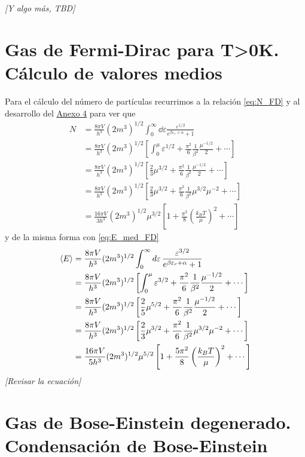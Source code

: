 \textit{[Y algo más, TBD]}

\section{Gas de Fermi-Dirac para T>0K. Cálculo de valores medios}

Para el cálculo del número de partículas recurrimos a la relación \eqref{eq:N_FD} y al desarrollo del \hyperref[Anx4]{Anexo 4} para ver que
\begin{align}
	N &= \frac{8\pi V}{h^3} (2m^3)^{1/2} \int_{0}^{\infty} \dd{\varepsilon} \frac{\varepsilon^{1/2}}{e^{\beta\varepsilon_r + \alpha} + 1}  \nonumber \\
	&= \frac{8\pi V}{h^3} (2m^3)^{1/2} \left[ \int_0^{\mu} \varepsilon^{1/2} + \frac{\pi^2}{6}\frac{1}{\beta^2}\frac{\mu^{-1/2}}{2} + \cdots \right] \nonumber \\
	&= \frac{8\pi V}{h^3} (2m^3)^{1/2} \left[ \frac{2}{3}\mu^{3/2} + \frac{\pi^2}{6}\frac{1}{\beta^2}\frac{\mu^{-1/2}}{2} + \cdots \right]  \nonumber \\
	&= \frac{8\pi V}{h^3} (2m^3)^{1/2} \left[ \frac{2}{3}\mu^{3/2} + \frac{\pi^2}{6}\frac{1}{\beta^2}\mu^{3/2}\mu^{-2} + \cdots \right] \\
	&= \frac{16\pi V}{3h^3} (2m^3)^{1/2} \mu^{3/2} \left[ 1 + \frac{\pi^2}{8}\left( \frac{k_B T}{\mu} \right)^2+ \cdots \right]  \nonumber
\end{align}
y de la misma forma con \eqref{eq:E_med_FD}
\begin{align}
	\expval{E} &= \frac{8\pi V}{h^3} (2m^3)^{1/2} \int_{0}^{\infty} \dd{\varepsilon} \frac{\varepsilon^{3/2}}{e^{\beta\varepsilon_r + \alpha} + 1} \nonumber \\
	&= \frac{8\pi V}{h^3} (2m^3)^{1/2} \left[ \int_0^{\mu} \varepsilon^{3/2} + \frac{\pi^2}{6}\frac{1}{\beta^2}\frac{\mu^{-1/2}}{2} + \cdots \right] \nonumber \\
	&= \frac{8\pi V}{h^3} (2m^3)^{1/2} \left[ \frac{2}{5}\mu^{5/2} + \frac{\pi^2}{6}\frac{1}{\beta^2}\frac{\mu^{-1/2}}{2} + \cdots \right]  \nonumber \\
	&= \frac{8\pi V}{h^3} (2m^3)^{1/2} \left[ \frac{2}{3}\mu^{3/2} + \frac{\pi^2}{6}\frac{1}{\beta^2}\mu^{3/2}\mu^{-2} + \cdots \right] \\
	&= \frac{16\pi V}{5h^3} (2m^3)^{1/2} \mu^{5/2} \left[ 1 + \frac{5\pi^2}{8}\left( \frac{k_B T}{\mu} \right)^2+ \cdots \right] \nonumber
\end{align}
\textit{[Revisar la ecuación]}

\section{Gas de Bose-Einstein degenerado. Condensación de Bose-Einstein}

